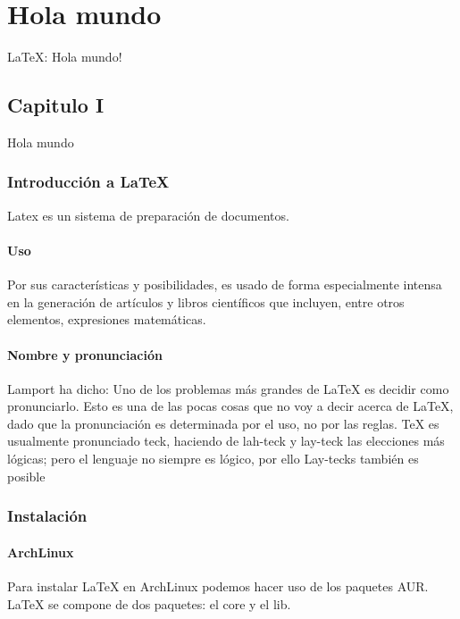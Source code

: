 \documentclass[a4paper, 11pt]{book}
\begin{document}
\tableofcontents 

    \part[]{Hola mundo}
    LaTeX: Hola mundo!

        \chapter{Capitulo I}
        Hola mundo
        
            \section[Introducción]{Introducción a LaTeX}
            Latex es un sistema de preparación de documentos.
                \subsection{Uso}
                Por sus características y posibilidades, es usado de forma especialmente intensa en la generación de artículos y libros científicos que incluyen, entre otros elementos, expresiones matemáticas.
                \subsection{Nombre y pronunciación}
                Lamport ha dicho: Uno de los problemas más grandes de LaTeX es decidir como pronunciarlo. Esto es una de las pocas cosas que no voy a decir acerca de LaTeX, dado que la pronunciación es determinada por el uso, no por las reglas. TeX es usualmente pronunciado teck, haciendo de lah-teck y lay-teck las elecciones más lógicas; pero el lenguaje no siempre es lógico, por ello Lay-tecks también es posible
            \section{Instalación}
                \subsection{ArchLinux}
                Para instalar LaTeX en ArchLinux podemos hacer uso de los paquetes AUR.
                LaTeX se compone de dos paquetes: el core y el lib.
\end{document}
